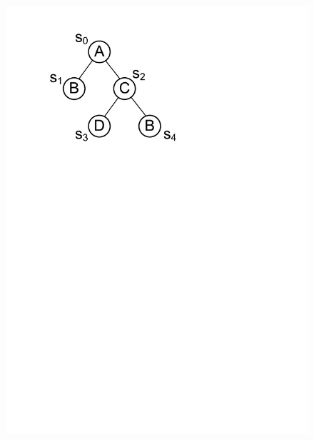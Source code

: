 \begin{figure}[t!]
{\includegraphics[scale=0.33]{images/tree_structure3}
\label{fig:tree_structure3}
}
\end{figure}
